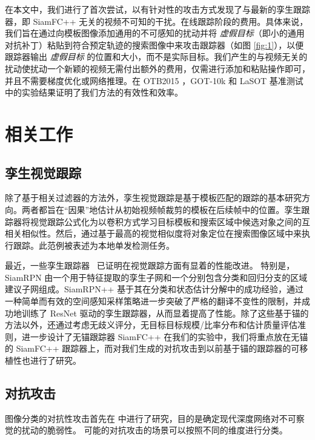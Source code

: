 在本文中，我们进行了首次尝试，以有针对性的攻击方式发现了与最新的孪生跟踪器，即 SiamFC++ \cite{SiamFC++}无关的视频不可知的干扰。在线跟踪阶段的费用。具体来说，我们旨在通过向模板图像添加通用的不可感知的扰动并将 \textit{虚假目标}（即小的通用对抗补丁）粘贴到符合预定轨迹的搜索图像中来攻击跟踪器（如图 \ref{fig:1}），以便跟踪器输出 \textit{虚假目标} 的位置和大小，而不是实际目标。我们产生的与视频无关的扰动使扰动一个新颖的视频无需付出额外的费用，仅需进行添加和粘贴操作即可，并且不需要梯度优化或网络推理。在 OTB2015 \cite{OTB}，GOT-10k \cite{GOT-10k} 和 LaSOT \cite{LaSOT} 基准测试中的实验结果证明了我们方法的有效性和效率。

\section{相关工作}

\subsection{孪生视觉跟踪}

除了基于相关过滤器的方法外，孪生视觉跟踪是基于模板匹配的跟踪的基本研究方向。两者都旨在“因果”地估计从初始视频帧裁剪的模板在后续帧中的位置。孪生跟踪器将视觉跟踪公式化为以卷积方式学习目标模板和搜索区域中候选对象之间的互相关相似性。然后，通过基于最高的视觉相似度将对象定位在搜索图像区域中来执行跟踪。此范例被表述为本地单发检测任务。

最近，一些孪生跟踪器~\cite{SiamRPN,SiamRPN++,SiamFC++} 已证明在视觉跟踪方面有显着的性能改进。
特别是，SiamRPN \cite{SiamRPN} 由一个用于特征提取的孪生子网和一个分别包含分类和回归分支的区域建议子网组成。SiamRPN++ \cite{SiamRPN++} 基于其在分类和状态估计分解中的成功经验，通过一种简单而有效的空间感知采样策略进一步突破了严格的翻译不变性的限制，并成功地训练了 ResNet 驱动的孪生跟踪器，从而显着提高了性能。除了这些基于锚的方法以外，还通过考虑无歧义评分，无目标目标规模/比率分布和估计质量评估准则，进一步设计了无锚跟踪器 SiamFC++ \cite{SiamFC++} 在我们的实验中，我们将重点放在无锚的 SiamFC++ 跟踪器上，而对我们生成的对抗攻击到以前基于锚的跟踪器的可移植性也进行了研究。

\subsection{对抗攻击}

图像分类的对抗性攻击首先在 \cite{intriguing} 中进行了研究，目的是确定现代深度网络对不可察觉的扰动的脆弱性。
可能的对抗攻击的场景可以按照不同的维度进行分类。

